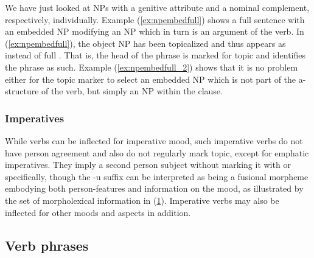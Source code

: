 We have just looked at NPs with a genitive attribute and a nominal complement,
respectively, individually. Example (\ref{ex:npembedfull}) shows a full
sentence with an embedded NP modifying an NP which in turn is an argument of
the verb. In (\ref{ex:npembedfull}), the object NP has been topicalized and
thus appears as  instead of full .
That is, the head of the phrase is marked for topic and identifies the phrase
as such. Example (\ref{ex:npembedfull_2}) shows that it is no problem either
for the topic marker to select an embedded NP which is not part of the
a-structure of the verb, but simply an NP within the clause.

\subsubsection{Imperatives}

While verbs can be inflected for imperative mood, such imperative verbs do not
have person agreement and also do not regularly mark topic, except for emphatic
imperatives. They imply a second person subject without marking it with
 or  specifically, though the
 {-u} suffix can be interpreted as being a fusional morpheme embodying
both person-features and information on the mood, as illustrated by the set of
morpholexical information in (\ref{ex:impfeat}). Imperative verbs may also be
inflected for other moods and aspects in addition.

\begin{figure}
\begin{morphlex}
\ex\label{ex:impfeat}%
\xe
\end{morphlex}
\end{figure}

\subsection{Verb phrases}
\label{subsec:vps}

